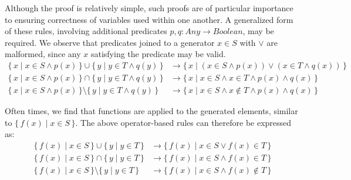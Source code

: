 \documentclass{article}
\newcommand{\Set}[2]{%
  \{\, #1 \mid #2 \, \}%
}
\begin{document}
Although the proof is relatively simple, such proofs are of particular importance to ensuring correctness of variables used within one another. A generalized form of these rules, involving additional predicates $p,q: Any \rightarrow Boolean$, may be required. We observe that predicates joined to a generator $x\in S$ with $\lor$ are malformed, since any $x$ satisfying the predicate may be valid.
\begin{align}
  \Set{x}{x \in S \land p(x)} \cup \Set{y}{y \in T \land q(y)} &\rightarrow \Set{x}{(x \in S \land p(x)) \lor (x \in T  \land q(x))}\\
  \Set{x}{x \in S \land p(x)} \cap \Set{y}{y \in T \land q(y)} &\rightarrow \Set{x}{x \in S \land x \in T \land p(x) \land q(x)}\\
  \Set{x}{x \in S \land p(x)} \setminus \Set{y}{y \in T \land q(y)} &\rightarrow \Set{x}{x \in S \land x \notin T \land p(x) \land q(x)}
\end{align}

Often times, we find that functions are applied to the generated elements, similar to $\Set{f(x)}{x \in S}$. The above operator-based rules can therefore be expressed as:
\begin{align}
  \Set{f(x)}{x \in S} \cup \Set{y}{y \in T} &\rightarrow \Set{f(x)}{x \in S \lor f(x) \in T}\\
  \Set{f(x)}{x \in S} \cap \Set{y}{y \in T} &\rightarrow \Set{f(x)}{x \in S \land f(x) \in T}\\
  \Set{f(x)}{x \in S} \setminus \Set{y}{y \in T} &\rightarrow \Set{f(x)}{x \in S \land f(x) \notin T}
\end{align}
\end{document}
